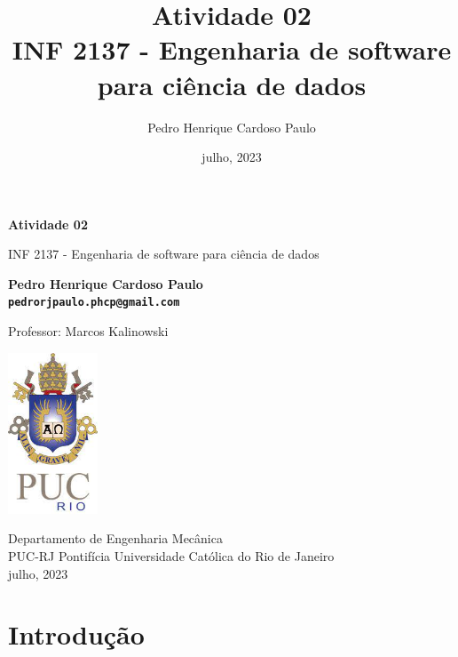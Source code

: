 \documentclass[10pt, a4paper]{article}
\begin{document}
\def\TITLE{Atividade 02}
\def\DISCIPLINE{INF 2137 - Engenharia de software para ciência de dados}
\def\PROFESSOR{Marcos Kalinowski}
\def\AUTHOR{Pedro Henrique Cardoso Paulo}
\def\CONTACT{pedrorjpaulo.phcp@gmail.com}
\def\DATE{julho, 2023}

\title{\textbf{\TITLE} \\ \DISCIPLINE}
\author{\AUTHOR}
\date{\DATE}

\begin{titlepage}
      \begin{center}
          \vspace*{1cm}

          \Huge
          \textbf{\TITLE}

          \vspace{0.5cm}
          \LARGE
          \DISCIPLINE

          \vspace{1.5cm}

          \textbf{\AUTHOR \\ {\tt \CONTACT}}

          \vfill
          Professor: \PROFESSOR

          \vspace{0.8cm}

          \includegraphics[width=0.2\textwidth]{../general/puc.jpg}

          \Large
          Departamento de Engenharia Mecânica\\
          PUC-RJ Pontifícia Universidade Católica do Rio de Janeiro\\
          \DATE

      \end{center}
  \end{titlepage}

\maketitle

\section{Introdução}
\end{document}
